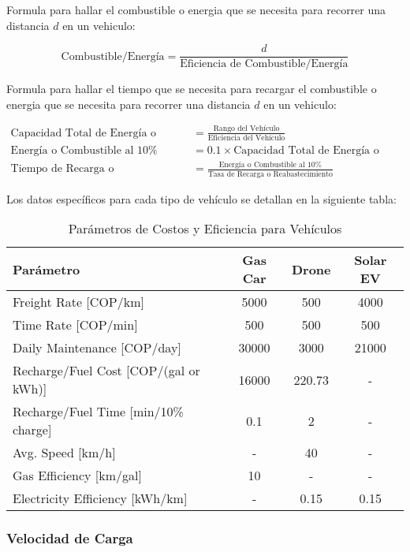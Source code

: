 \documentclass[12pt]{article}
\begin{document}
Formula para hallar el combustible o energia que se necesita para recorrer una distancia $d$ en un vehiculo:

\begin{equation}
  \text{Combustible/Energía} = \frac{d}{\text{Eficiencia de Combustible/Energía}}
\end{equation}

Formula para hallar el tiempo que se necesita para recargar el combustible o energia que se necesita para recorrer una distancia $d$ en un vehiculo:

\begin{align}
    \text{Capacidad Total de Energía o Combustible} &= \frac{\text{Rango del Vehículo}}{\text{Eficiencia del Vehículo}} \\
    \text{Energía o Combustible al 10\%} &= 0.1 \times \text{Capacidad Total de Energía o Combustible} \\
    \text{Tiempo de Recarga o Reabastecimiento} &= \frac{\text{Energía o Combustible al 10\%}}{\text{Tasa de Recarga o Reabastecimiento}}
\end{align}

Los datos específicos para cada tipo de vehículo se detallan en la siguiente tabla:

\begin{table}[h!]
\centering
\begin{tabular}{|l|c|c|c|}
\hline
\textbf{Parámetro} & \textbf{Gas Car} & \textbf{Drone} & \textbf{Solar EV} \\
\hline
Freight Rate [COP/km] & 5000 & 500 & 4000 \\
Time Rate [COP/min] & 500 & 500 & 500 \\
Daily Maintenance [COP/day] & 30000 & 3000 & 21000 \\
Recharge/Fuel Cost [COP/(gal or kWh)] & 16000 & 220.73 & - \\
Recharge/Fuel Time [min/10\% charge] & 0.1 & 2 & - \\
Avg. Speed [km/h] & - & 40 & - \\
Gas Efficiency [km/gal] & 10 & - & - \\
Electricity Efficiency [kWh/km] & - & 0.15 & 0.15 \\
\hline
\end{tabular}
\caption{Parámetros de Costos y Eficiencia para Vehículos}
\end{table}

\subsubsection{Velocidad de Carga}
\end{document}
